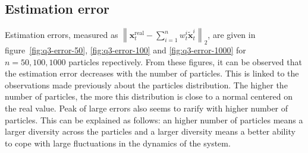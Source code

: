 \documentclass[english, DIV=13]{scrartcl}
\newcommand\norm[1]{\left\lVert#1\right\rVert}
\begin{document}
\subsection{Estimation error}
Estimation errors, measured as 
$\norm{\mathbf{x}_t^{\text{real}} - \sum_{i=1}^n w_t^i\tilde{\mathbf{x}}_t^i}_2$,
are given in figure~\ref{fig:q3-error-50}, \ref{fig:q3-error-100} and
\ref{fig:q3-error-1000} for $n = 50, 100, 1000$ particles repectively.
From these figures, it can be observed that the estimation error decreases with the
number of particles. This is linked to the observations made previously about the
particles distribution. The higher the number of particles, the more this distribution
is close to a normal centered on the real value. Peak of large errors also seems to
rarify with higher number of particles. This can be explained as follows: an higher
number of particles means a larger diversity across the particles and a larger diversity
means a better ability to cope with large fluctuations in the dynamics of the system.
\end{document}

